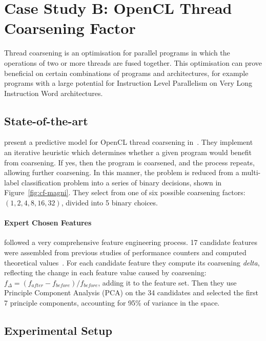 \section{Case Study B: OpenCL Thread Coarsening Factor}
\label{sec:deeptune-case-study-b}

Thread coarsening is an optimisation for parallel programs in which the operations of two or more threads are fused together. This optimisation can prove beneficial on certain combinations of programs and architectures, for example programs with a large potential for Instruction Level Parallelism on Very Long Instruction Word architectures.

\subsection{State-of-the-art} \citeauthor{Magni2014}present a predictive model for OpenCL thread coarsening in~\cite{Magni2014}. They implement an iterative heuristic which determines whether a given program would benefit from coarsening. If yes, then the program is coarsened, and the process repeats, allowing further coarsening. In this manner, the problem is reduced from a multi-label classification problem into a series of binary decisions, shown in Figure~\ref{fig:cf-magni}. They select from one of six possible coarsening factors: $(1, 2, 4, 8, 16, 32)$, divided into 5 binary choices.





\paragraph*{Expert Chosen Features}

\citeauthor{Magni2014}followed a very comprehensive feature engineering process. 17 candidate features were assembled from previous studies of performance counters and computed theoretical values~\cite{Magni2,Sim2012}. For each candidate feature they compute its coarsening \emph{delta}, reflecting the change in each feature value caused by coarsening: $f_{\Delta} = (f_{after} - f_{before}) / f_{before}$, adding it to the feature set. Then they use Principle Component Analysis (PCA) on the 34 candidates and selected the first 7 principle components, accounting for 95\% of variance in the space.

\subsection{Experimental Setup}

